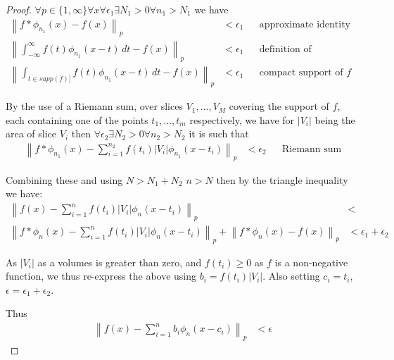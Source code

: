 \documentclass{article} %
\begin{document}
\begin{proof}
	$\forall p \in \lbrace 1,\infty \rbrace \forall x  \forall \epsilon_1 \exists N_1>0 \forall n_1>N_1$ we have
	\begin{align}
	\left\| f \ast \phi_{n_1}(x) - f(x) \right\|_p &< \epsilon_1 && \text{approximate identity property} \\
	\left\| \int_{-\infty}^\infty f(t)\phi_{n_1}(x-t) \, dt - f(x)\right\|_p &< \epsilon_1 && \text{definition of convolution} \\
	\left\| \int_{t \in supp(f)]} f(t)\phi_{n_1}(x-t) \, dt - f(x)\right\|_p &< \epsilon_1 && \text{compact support of $f$}
	\end{align}
	
	By the use of a Riemann sum, over slices $V_1,\ldots, V_M$ covering the support of $f$, each containing one of the points $t_1,...,t_m$ respectively,
	we have for $|V_i|$ being the area of slice $V_i$ then
	$\forall \epsilon_2 \exists N_2>0 \forall n_2>N_2$ it is such that 
	\begin{align}
		\left\| f \ast \phi_{n_1}(x) - \sum^{n_2}_{i=1} f(t_i)|V_i|\phi_{n_1}(x-t_i) \right\|_p &< \epsilon_2 && \text{Riemann sum} 
	\end{align}
	
	Combining these and using $N > N_1 + N_2$ $n>N$ then by the triangle inequality we have:
	\begin{align}
	\left\| f(x) - \sum^{n}_{i=1} f(t_i)|V_i|\phi_n(x-t_i) \right\|_p &<  &&  \\
	\left\| f \ast \phi_n(x) - \sum^{n}_{i=1} f(t_i)|V_i|\phi_n(x-t_i) \right\|_p 
	+  \left\| f \ast \phi_n(x) - f(x) \right\|_p &< \epsilon_1 + \epsilon_2 
	\end{align}
	
	As $|V_i|$ as a volumes is greater than zero, and $f(t_i) \ge 0$ as $f$ is a non-negative function, we thus re-express the above using $b_i=f(t_i)|V_i|$.
	Also setting $c_i=t_i$, $\epsilon=\epsilon_1+\epsilon_2$.
	
	Thus 
	\begin{align}
	\left\| f(x) - \sum^{n}_{i=1} b_i \phi_n(x-c_i) \right\|_p &<  \epsilon
	\end{align}
\end{proof}
\end{document}
